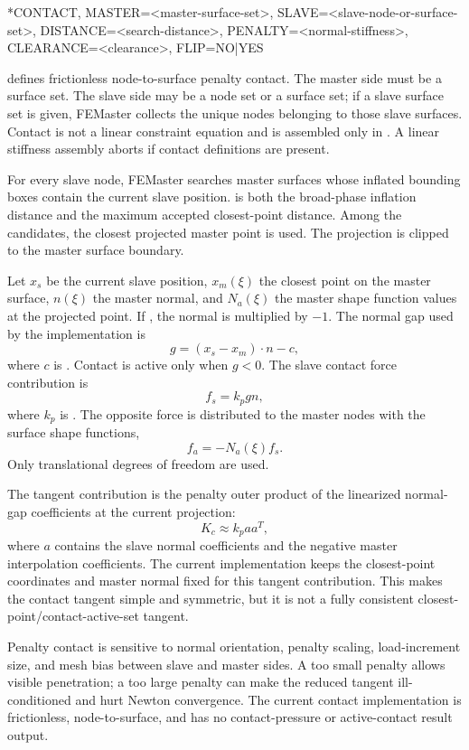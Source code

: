 \begin{syntax}
*CONTACT, MASTER=<master-surface-set>, SLAVE=<slave-node-or-surface-set>,
          DISTANCE=<search-distance>, PENALTY=<normal-stiffness>,
          CLEARANCE=<clearance>, FLIP=NO|YES
\end{syntax}

 defines frictionless node-to-surface penalty contact. The master side must be a surface set. The slave side may be a node set or a surface set; if a slave surface set is given, FEMaster collects the unique nodes belonging to those slave surfaces. Contact is not a linear constraint equation and is assembled only in . A linear stiffness assembly aborts if contact definitions are present.

For every slave node, FEMaster searches master surfaces whose inflated bounding boxes contain the current slave position.  is both the broad-phase inflation distance and the maximum accepted closest-point distance. Among the candidates, the closest projected master point is used. The projection is clipped to the master surface boundary.

Let \(x_s\) be the current slave position, \(x_m(\xi)\) the closest point on the master surface, \(n(\xi)\) the master normal, and \(N_a(\xi)\) the master shape function values at the projected point. If , the normal is multiplied by \(-1\). The normal gap used by the implementation is
\[
g = (x_s - x_m)\cdot n - c ,
\]
where \(c\) is . Contact is active only when \(g<0\). The slave contact force contribution is
\[
f_s = k_p g n ,
\]
where \(k_p\) is . The opposite force is distributed to the master nodes with the surface shape functions,
\[
f_a = -N_a(\xi) f_s .
\]
Only translational degrees of freedom are used.

The tangent contribution is the penalty outer product of the linearized normal-gap coefficients at the current projection:
\[
K_c \approx k_p a a^T,
\]
where \(a\) contains the slave normal coefficients and the negative master interpolation coefficients. The current implementation keeps the closest-point coordinates and master normal fixed for this tangent contribution. This makes the contact tangent simple and symmetric, but it is not a fully consistent closest-point/contact-active-set tangent.

\begin{warningbox}
Penalty contact is sensitive to normal orientation, penalty scaling, load-increment size, and mesh bias between slave and master sides. A too small penalty allows visible penetration; a too large penalty can make the reduced tangent ill-conditioned and hurt Newton convergence. The current contact implementation is frictionless, node-to-surface, and has no contact-pressure or active-contact result output.
\end{warningbox}

